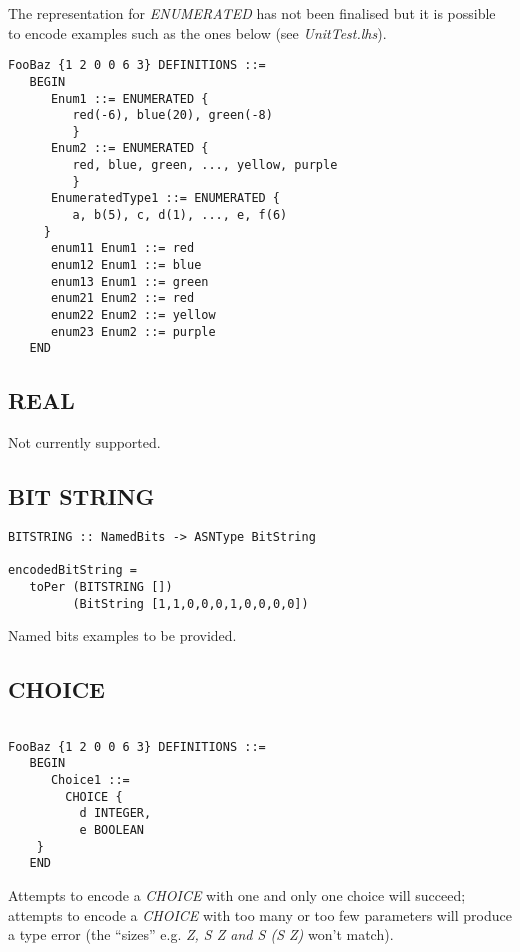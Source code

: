 \documentclass{article}
\begin{document}
The representation for {\em ENUMERATED} has not been finalised but it is
possible to encode examples such as the ones below (see {\em UnitTest.lhs}).

\begin{lstlisting}[frame=single]
FooBaz {1 2 0 0 6 3} DEFINITIONS ::=
   BEGIN
      Enum1 ::= ENUMERATED {
         red(-6), blue(20), green(-8)
         }
      Enum2 ::= ENUMERATED {
         red, blue, green, ..., yellow, purple
         }
      EnumeratedType1 ::= ENUMERATED {
         a, b(5), c, d(1), ..., e, f(6)
	 }
      enum11 Enum1 ::= red
      enum12 Enum1 ::= blue
      enum13 Enum1 ::= green
      enum21 Enum2 ::= red
      enum22 Enum2 ::= yellow
      enum23 Enum2 ::= purple
   END
\end{lstlisting}

\subsection{REAL}

Not currently supported.

\subsection{BIT STRING}

\begin{lstlisting}[frame=single]
BITSTRING :: NamedBits -> ASNType BitString

encodedBitString = 
   toPer (BITSTRING []) 
         (BitString [1,1,0,0,0,1,0,0,0,0])
\end{lstlisting}

Named bits examples to be provided.

\subsection{CHOICE}

\begin{lstlisting}[frame=single]

FooBaz {1 2 0 0 6 3} DEFINITIONS ::=
   BEGIN
      Choice1 ::= 
        CHOICE {
          d INTEGER,
          e BOOLEAN
	}
   END
\end{lstlisting}

Attempts to encode a {\em CHOICE} with one and only one choice will 
succeed; attempts to encode a {\em CHOICE} with too many or too few
parameters will produce a type error (the ``sizes'' e.g. {\em Z, S Z and S (S Z)} won't match).
\end{document}

